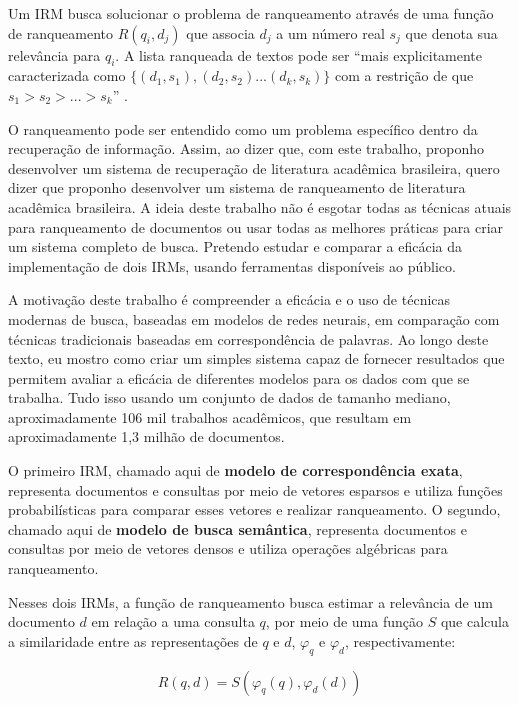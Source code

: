 \documentclass[
	12pt,				%
	openright,			%
	oneside,			%
	a4paper,			%
	english,			%
	french,				%
	spanish,			%
	brazil				%
	]{abntex2}
\begin{document}
Um IRM busca solucionar o problema de ranqueamento através de uma função de ranqueamento \(R(q_i, d_j)\) que associa \(d_j\) a um número real $s_j$ que denota sua relevância para \(q_i\).
A lista ranqueada de textos pode ser ``mais explicitamente caracterizada como $\{(d_1, s_1), (d_2, s_2) ... (d_k, s_k)\}$ com a restrição de que $s_1 > s_2 > ... > s_k$'' \cite{biblia}.

O ranqueamento pode ser entendido como um problema específico dentro da recuperação de informação. Assim, ao dizer que, com este trabalho, proponho desenvolver um sistema de recuperação de literatura acadêmica brasileira, quero dizer que proponho desenvolver um sistema de ranqueamento de literatura acadêmica brasileira.
A ideia deste trabalho não é esgotar todas as técnicas atuais para ranqueamento de documentos ou usar todas as melhores práticas para criar um sistema completo de busca.
Pretendo estudar e comparar a eficácia da implementação de dois IRMs, usando ferramentas disponíveis ao público.

A motivação deste trabalho é compreender a eficácia e o uso de técnicas modernas de busca, baseadas em modelos de redes neurais, em comparação com técnicas tradicionais baseadas em correspondência de palavras.
Ao longo deste texto, eu mostro como criar um simples sistema capaz de fornecer resultados que permitem avaliar a eficácia de diferentes modelos para os dados com que se trabalha.
Tudo isso usando um conjunto de dados de tamanho mediano, aproximadamente 106 mil trabalhos acadêmicos, que resultam em aproximadamente 1,3 milhão de documentos.

O primeiro IRM, chamado aqui de \textbf{modelo de correspondência exata}, representa documentos e consultas por meio de vetores esparsos e utiliza funções probabilísticas para comparar esses vetores e realizar ranqueamento. O segundo, chamado aqui de \textbf{modelo de busca semântica}, representa documentos e consultas por meio de vetores densos e utiliza operações algébricas para ranqueamento.

Nesses dois IRMs, a função de ranqueamento busca estimar a relevância de um documento $d$ em relação a uma consulta $q$, por meio de uma função $S$ que calcula a similaridade entre as representações de $q$ e $d$, $\varphi_q$ e $\varphi_d$, respectivamente:

\begin{equation}\label{eq:irm-rank}
    R(q, d) = S(\varphi_q(q), \varphi_d(d))
\end{equation}
\end{document}
